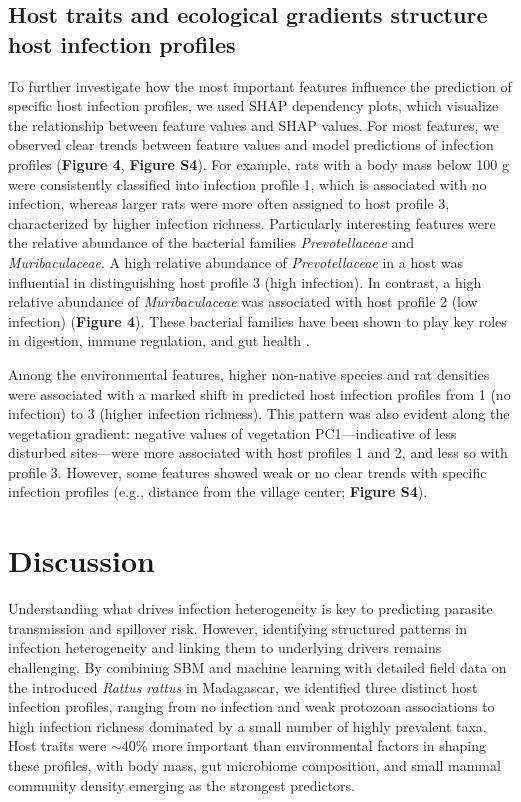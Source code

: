 \documentclass[oneside, a4paper, onecolumn, 11pt]{article}
\begin{document}
\subsection*{Host traits and ecological gradients structure host infection profiles}
To further investigate how the most important features influence the prediction of specific host infection profiles, we used SHAP dependency plots, which visualize the relationship between feature values and SHAP values. For most features, we observed clear trends between feature values and model predictions of infection profiles (\textbf{Figure 4}, \textbf{Figure S4}). For example, rats with a body mass below 100 g were consistently classified into infection profile 1, which is associated with no infection, whereas larger rats were more often assigned to host profile 3, characterized by higher infection richness. Particularly interesting features were the relative abundance of the bacterial families \textit{Prevotellaceae} and \textit{Muribaculaceae}. A high relative abundance of \textit{Prevotellaceae} in a host was influential in distinguishing host profile 3 (high infection). In contrast, a high relative abundance of \textit{Muribaculaceae} was associated with host profile 2 (low infection) (\textbf{Figure 4}). These bacterial families have been shown to play key roles in digestion, immune regulation, and gut health \citep{Gellman2023-zm,Betancur-Murillo2022-cc,Zhu2024-ff}. 

Among the environmental features, higher non-native species and rat densities were associated with a marked shift in predicted host infection profiles from 1 (no infection) to 3 (higher infection richness). This pattern was also evident along the vegetation gradient: negative values of vegetation PC1---indicative of less disturbed sites---were more associated with host profiles 1 and 2, and less so with profile 3. However, some features showed weak or no clear trends with specific infection profiles (e.g., distance from the village center; \textbf{Figure S4}). 

\section*{Discussion}

Understanding what drives infection heterogeneity is key to predicting parasite transmission and spillover risk. However, identifying structured patterns in infection heterogeneity and linking them to underlying drivers remains challenging. By combining SBM and machine learning with detailed field data on the introduced \textit{Rattus rattus} in Madagascar, we identified three distinct host infection profiles, ranging from no infection and weak protozoan associations to high infection richness dominated by a small number of highly prevalent taxa. Host traits were $\sim$40\% more important than environmental factors in shaping these profiles, with body mass, gut microbiome composition, and small mammal community density emerging as the strongest predictors.
\end{document}
